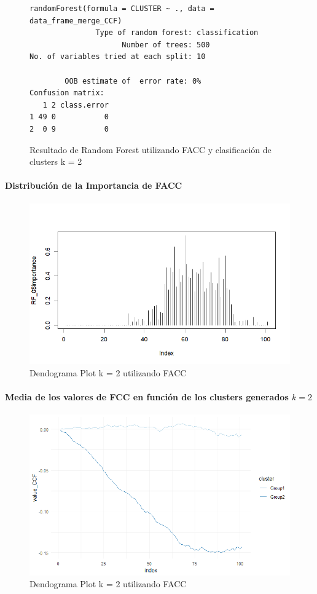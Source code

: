 \begin{figure}[H]
    \centering
    \begin{lstlisting}[frame=single, basicstyle=\small\ttfamily]
        randomForest(formula = CLUSTER ~ ., data = data_frame_merge_CCF) 
               Type of random forest: classification
                     Number of trees: 500
No. of variables tried at each split: 10

        OOB estimate of  error rate: 0%
Confusion matrix:
   1 2 class.error
1 49 0           0
2  0 9           0
    \end{lstlisting}
    \caption{Resultado de Random Forest utilizando FACC y clasificación de clusters k = 2}\label{fig:random_forest_ccf_result_RF_1}
\end{figure}

\paragraph{Distribución de la Importancia de FACC}

\begin{figure}[H]
    \centering
    \includegraphics[scale = 0.8]{img/06-5-ccf.png}
    \caption{Dendograma Plot k = 2 utilizando FACC}
    \label{fig:ccf_imp}
\end{figure}

\paragraph{Media de los valores de FCC en función de los clusters generados $k = 2$}

\begin{figure}[H]
    \centering
    \includegraphics[scale = 0.8]{img/06-6-ccf.png}
    \caption{Dendograma Plot k = 2 utilizando FACC}
    \label{fig:ccf_cls}
\end{figure}